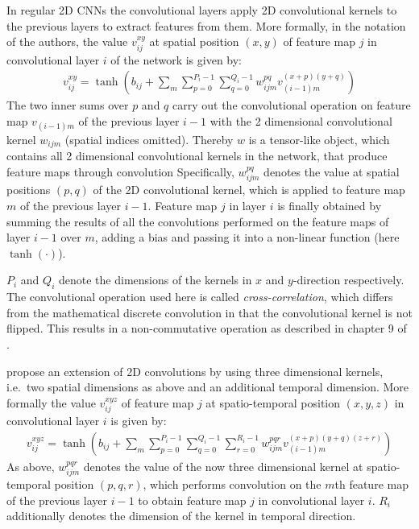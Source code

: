 In regular 2D CNNs the convolutional layers apply 2D convolutional kernels to the previous layers to extract features from them.
More formally, in the notation of the authors, the value $v_{ij}^{xy}$ at spatial position $(x,y)$ of feature map $j$ in convolutional layer $i$ of the network is given by:
\begin{align*}
    v_{ij}^{xy} = \tanh \left( b_{ij} + \sum_m \sum_{p=0}^{P_i -1} \sum_{q = 0}^{Q_i - 1} w_{ijm}^{pq} v_{(i-1)m}^{(x+p)(y+q)} \right)
\end{align*}
The two inner sums over $p$ and $q$ carry out the convolutional operation on feature map $v_{(i-1)m}$ of the previous layer $i-1$ with the 2 dimensional convolutional kernel $w_{ijm}$ (spatial indices omitted).
Thereby $w$ is a tensor-like object, which contains all 2 dimensional convolutional kernels in the network, that produce feature maps through convolution
Specifically, $w_{ijm}^{pq}$ denotes the value at spatial positions $(p,q)$ of the 2D convolutional kernel, which is applied to feature map $m$ of the previous layer $i-1$.
Feature map $j$ in layer $i$ is finally obtained by summing the results of all the convolutions performed on the feature maps of layer $i-1$ over $m$, adding a bias and passing it into a non-linear function (here $\tanh(\cdot)$).

$P_i$ and $Q_i$ denote the dimensions of the kernels in $x$ and $y$-direction respectively.
The convolutional operation used here is called \textit{cross-correlation}, which differs from the mathematical discrete convolution in that the convolutional kernel is not flipped. This results in a non-commutative operation as described in chapter 9 of \cite{goodfellow_deep_2016}.

\textcite{ji_3d_2013} propose an extension of 2D convolutions by using three dimensional kernels, i.e.\ two spatial dimensions as above and an additional temporal dimension.
More formally the value $v_{ij}^{xyz}$ of feature map $j$ at spatio-temporal position $(x,y,z)$ in convolutional layer $i$ is given by:
\begin{align*}
    v_{ij}^{xyz} = \tanh \left( b_{ij} + \sum_m \sum_{p=0}^{P_i -1} \sum_{q = 0}^{Q_i - 1} \sum_{r = 0}^{R_i - 1} w_{ijm}^{pqr} v_{(i-1)m}^{(x+p)(y+q)(z+r)} \right)
\end{align*}
As above, $w_{ijm}^{pqr}$ denotes the value of the now three dimensional kernel at spatio-temporal position $(p,q,r)$, which performs convolution on the $m$th feature map of the previous layer $i-1$ to obtain feature map $j$ in convolutional layer $i$.
$R_i$ additionally denotes the dimension of the kernel in temporal direction. 

